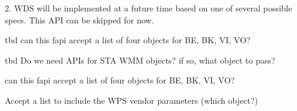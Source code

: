 \begin{DoxyRefList}
2. W\-D\-S will be implemented at a future time based on one of several possible specs. This A\-P\-I can be skipped for now.  
\item[\label{todo__todo000006}%
\hypertarget{todo__todo000006}{}%
Member \hyperlink{group__FAPI__WLAN_ga337ef7e43df8d59e4607600c0daeb00b}{fapi\-\_\-wlan\-\_\-wmm\-\_\-sta\-\_\-get} (const char $\ast$ifname, \hyperlink{structObjList}{Obj\-List} $\ast$wl\-Obj, unsigned int flags)]tbd can this fapi accept a list of four objects for B\-E, B\-K, V\-I, V\-O?  
\item[\label{todo__todo000005}%
\hypertarget{todo__todo000005}{}%
Member \hyperlink{group__FAPI__WLAN_gaffc71927094b8d03aa95d9bdeb5bb63d}{fapi\-\_\-wlan\-\_\-wmm\-\_\-sta\-\_\-set} (const char $\ast$ifname, \hyperlink{structObjList}{Obj\-List} $\ast$wl\-Obj, unsigned int flags)]tbd Do we need A\-P\-Is for S\-T\-A W\-M\-M objects? if so, what object to pass?  
\item[\label{todo__todo000007}%
\hypertarget{todo__todo000007}{}%
Member \hyperlink{group__FAPI__WLAN_gac70302d8dcc43f12fb4e25cf00b33ea6}{fapi\-\_\-wlan\-\_\-wmm\-\_\-sta\-\_\-stats\-\_\-query} (const char $\ast$ifname, \hyperlink{structObjList}{Obj\-List} $\ast$wl\-Obj, unsigned int flags)]can this fapi accept a list of four objects for B\-E, B\-K, V\-I, V\-O?  
\item[\label{todo__todo000002}%
\hypertarget{todo__todo000002}{}%
Member \hyperlink{group__FAPI__WLAN_gab50168998ee227f14a464feb0585f37c}{fapi\-\_\-wlan\-\_\-wps\-\_\-set} (const char $\ast$ifname, \hyperlink{structObjList}{Obj\-List} $\ast$wl\-Obj, unsigned int flags)]Accept a list to include the W\-P\-S vendor parameters (which object?) 
\end{DoxyRefList}